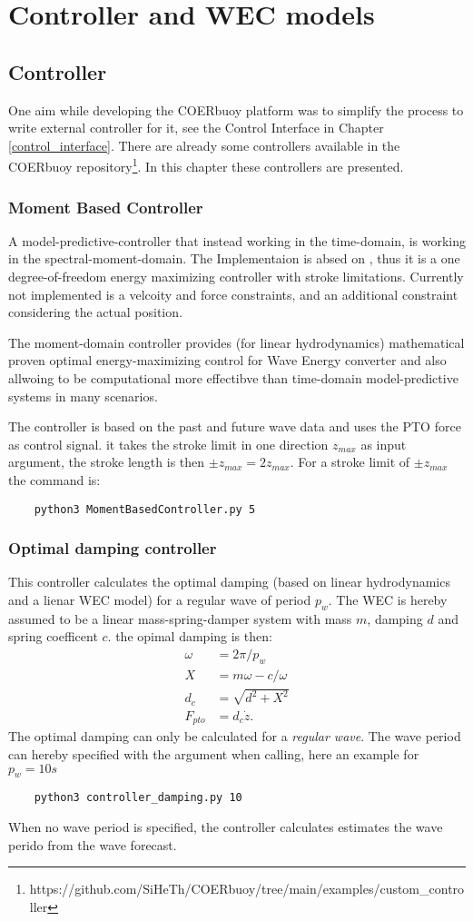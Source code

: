 \documentclass[oneside,10pt,a4paper]{book}
\begin{document}
\chapter{Controller and WEC models}
\section{Controller}
One aim while developing the COERbuoy platform was to simplify the process to write external controller for it, see the Control Interface in Chapter \ref{control_interface}. There are already some controllers available in the COERbuoy repository\footnote{https://github.com/SiHeTh/COERbuoy/tree/main/examples/custom\_controller}. In this chapter these controllers are presented.
\subsection{Moment Based Controller}
A model-predictive-controller that instead working in the time-domain, is working in the spectral-moment-domain. The Implementaion is absed on \cite{control_mbc_horizon}, thus it is a one degree-of-freedom energy maximizing controller with stroke limitations. Currently not implemented is a velcoity and force constraints, and an additional constraint considering the actual position.

The moment-domain controller provides (for linear hydrodynamics) mathematical proven optimal energy-maximizing control for Wave Energy converter and also allwoing to be computational more effectibve than time-domain model-predictive systems in many scenarios.

The controller is based on the past and future wave data and uses the PTO force as control signal. it takes the stroke limit in one direction $z_{max}$ as input argument, the stroke length is then $\pm z_{max}=2z_{max}$. For a stroke limit of $\pm z_{max}$ the command is:
\begin{verbatim}
	python3 MomentBasedController.py 5
\end{verbatim}
\subsection{Optimal damping controller}
This controller calculates the optimal damping (based on linear hydrodynamics and a lienar WEC model) for a regular wave of period $p_w$. The WEC is hereby assumed to be a linear mass-spring-damper system with mass $m$, damping $d$ and spring coefficent $c$. the opimal damping is then:
\begin{align*}
	\omega&=2\pi/p_w\\
	X&=m\omega-c/\omega\\
	d_c&=\sqrt{d^2+X^2}\\
	F_{pto}&=d_c\dot{z}\text{.}
\end{align*}
The optimal damping can only be calculated for a \textit{regular wave}. The wave period can hereby specified with the argument when calling, here an example for $p_w=10 s$
\begin{verbatim}
	python3 controller_damping.py 10
\end{verbatim}
When no wave period is specified, the controller calculates estimates the wave perido from the wave forecast.
\end{document}
